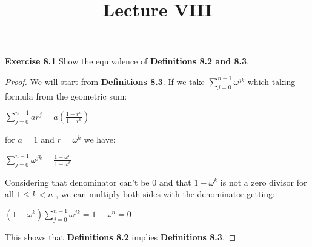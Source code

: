 \documentclass[a4paper]{article}
\title{\vspace{-2cm}Lecture VIII\vspace{-2cm}}
\date{}
\begin{document}
\maketitle
\noindent \textbf{Exercise 8.1}  Show the equivalence of \textbf{Definitions 8.2 and 8.3}.
\begin{proof}
We will start from \textbf{Definitions 8.3}. If we take $\sum_{j=0}^{n-1}\omega^{jk}$ which taking formula from the geometric sum:
\begin{center}
$\sum_{j=0}^{n-1}ar^{j}=a\left( \frac{1- r^{n}}{1- r^{k}}\right)$
\end{center}
for $a = 1$ and $r = \omega^{k}$ we have:
\begin{center}
$\sum_{j=0}^{n-1}\omega^{jk}=\frac{1- \omega^{n}}{1- \omega^{k}}$
\end{center}
Considering that denominator can't be 0 and that ${1- \omega^{k}}$ is not a zero divisor for all $1 \leq k < n$ , we can multiply both sides with the denominator getting:
\begin{center}
$\left(1- \omega^{k}\right)\sum_{j=0}^{n-1}\omega^{jk}={1- \omega^{n}}=0$
\end{center}
This shows that \textbf{Definitions 8.2} implies \textbf{Definitions 8.3}.
\end{proof}
\end{document}
